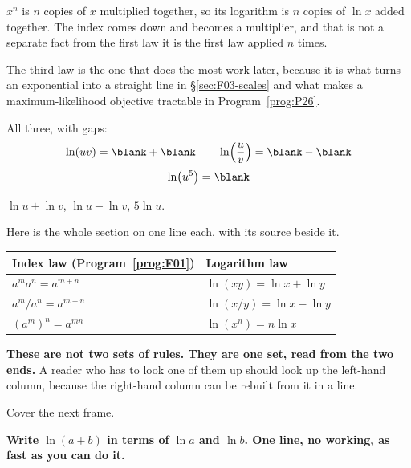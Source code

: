 \begin{fr}
$x^{n}$ is $n$ copies of $x$ multiplied together, so its logarithm is $n$
copies of $\ln x$ added together. The index comes down and becomes a
multiplier, and that is not a separate fact from the first law \dash{} it is
the first law applied $n$ times.

The third law is the one that does the most work later, because it is what
turns an exponential into a straight line in \S\ref{sec:F03-scales} and what
makes a maximum-likelihood objective tractable in
Program~\ref{prog:P26}.

All three, with gaps:
\[ \ln(uv) = \blank + \blank \qquad
   \ln\!\left(\frac{u}{v}\right) = \blank - \blank \]
\[ \ln\!\left(u^{5}\right) = \blank \]
\dotline
\nextframe
\end{fr}

\begin{fr}
\begin{ansblock}
$\ln u + \ln v$, \quad $\ln u - \ln v$, \quad $5 \ln u$.
\end{ansblock}

Here is the whole section on one line each, with its source beside it.

\begin{center}
\begin{tabular}{ll}
\toprule
Index law (Program~\ref{prog:F01}) & Logarithm law \\
\midrule
$a^{m} a^{n} = a^{m+n}$ & $\ln(xy) = \ln x + \ln y$ \\
$a^{m} / a^{n} = a^{m-n}$ & $\ln(x/y) = \ln x - \ln y$ \\
$\left(a^{m}\right)^{n} = a^{mn}$ & $\ln\!\left(x^{n}\right) = n \ln x$ \\
\bottomrule
\end{tabular}
\end{center}

\textbf{These are not two sets of rules. They are one set, read from the two
ends.} A reader who has to look one of them up should look up the left-hand
column, because the right-hand column can be rebuilt from it in a line.
\end{fr}

\begin{fr}
Cover the next frame.

\textbf{Write $\ln(a + b)$ in terms of $\ln a$ and $\ln b$. One line, no
working, as fast as you can do it.}
\dotline
\nextframe
\end{fr}


